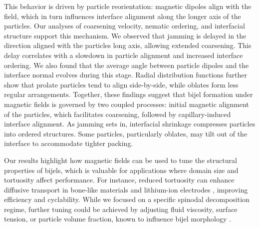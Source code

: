 This behavior is driven by particle reorientation: magnetic dipoles align with the field, which in turn influences interface alignment along the longer axis 
of the particles. Our analyses of coarsening velocity, nematic ordering, and interfacial structure support this mechanism. We observed that jamming is delayed 
in the direction aligned with the particles long axis, allowing extended coarsening. This delay correlates with a slowdown in particle alignment and increased 
interface ordering. We also found that the average angle between particle dipoles and the interface normal evolves during this stage. Radial distribution 
functions further show that prolate particles tend to align side-by-side, while oblates form less regular arrangements.
Together, these findings suggest that bijel formation under magnetic fields is governed by two coupled processes: initial magnetic alignment of the particles, 
which facilitates coarsening, followed by capillary-induced interface alignment. As jamming sets in, interfacial shrinkage compresses particles into ordered 
structures. Some particles, particularly oblates, may tilt out of the interface to accommodate tighter packing.

Our results highlight how magnetic fields can be used to tune the structural properties of bijels, which is valuable for applications where domain size and 
tortuosity affect performance. For instance, reduced tortuosity can enhance diffusive transport in bone-like materials \cite{prakoso2023tortuosity} and 
lithium-ion electrodes \cite{chen2020tortuosity, ebner2014tortuosity}, improving efficiency and cyclability. While we focused on a specific spinodal 
decomposition regime, further tuning could be achieved by adjusting fluid viscosity, surface tension, or particle volume fraction, known to influence 
bijel morphology \cite{jansen_bijels_2011, hijnen_bijels_2015}.

